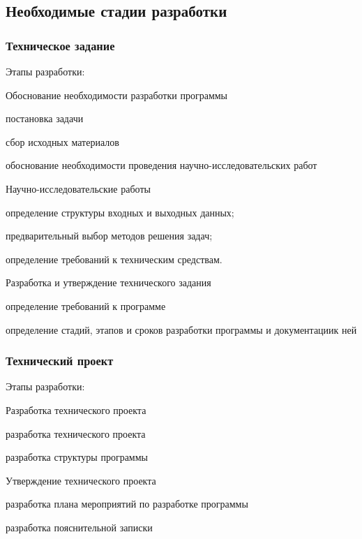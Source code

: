 \subsection{Необходимые стадии разработки}
\subsubsection{Техническое задание}
Этапы разработки:
\begin{my_enumerate}
    \item Обоснование необходимости разработки программы
        \begin{my_enumerate}
            \item постановка задачи
            \item сбор исходных материалов
            \item обоснование необходимости проведения научно-исследовательских работ
        \end{my_enumerate}
    \item Научно-исследовательские работы
        \begin{my_enumerate}
            \item определение структуры входных и выходных данных;
            \item предварительный выбор методов решения задач;
            \item определение требований к техническим средствам.
        \end{my_enumerate}
    \item Разработка и утверждение технического задания
        \begin{my_enumerate}
            \item определение требований к программе
            \item определение стадий, этапов и сроков разработки программы и документациик ней
        \end{my_enumerate}
\end{my_enumerate}


\subsubsection{Технический проект}
Этапы разработки:
\begin{my_enumerate}
    \item Разработка технического проекта
    \begin{my_enumerate}
        \item разработка технического проекта
        \item разработка структуры программы
    \end{my_enumerate}
    \item Утверждение технического проекта
    \begin{my_enumerate}
        \item разработка плана мероприятий по разработке программы
        \item разработка пояснительной записки
    \end{my_enumerate}
\end{my_enumerate}


